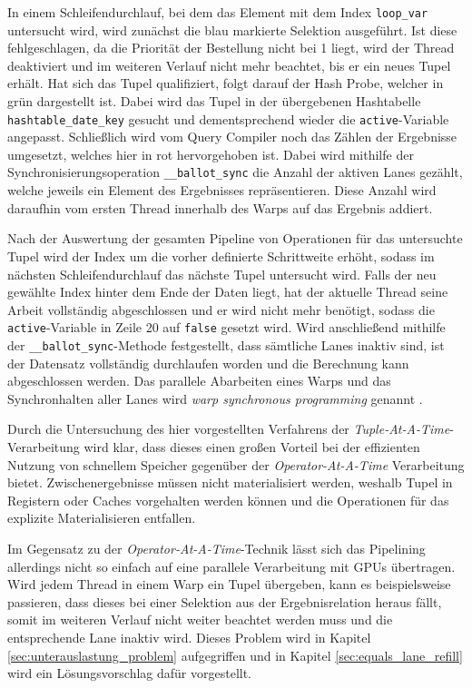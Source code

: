 In einem Schleifendurchlauf, bei dem das Element mit dem Index \texttt{loop\_var} untersucht wird, wird zunächst die blau markierte Selektion ausgeführt.
Ist diese fehlgeschlagen, da die Priorität der Bestellung nicht bei 1 liegt, wird der Thread deaktiviert und im weiteren Verlauf nicht mehr beachtet, bis er ein neues Tupel erhält.
Hat sich das Tupel qualifiziert, folgt darauf der Hash Probe, welcher in grün dargestellt ist.
Dabei wird das Tupel in der übergebenen Hashtabelle \texttt{hashtable\_date\_key} gesucht und dementsprechend wieder die \texttt{active}-Variable angepasst.
Schließlich wird vom Query Compiler noch das Zählen der Ergebnisse umgesetzt, welches hier in rot hervorgehoben ist.
Dabei wird mithilfe der Synchronisierungsoperation \texttt{\_\_ballot\_sync} die Anzahl der aktiven Lanes gezählt, welche jeweils ein Element des Ergebnisses repräsentieren.
Diese Anzahl wird daraufhin vom ersten Thread innerhalb des Warps auf das Ergebnis addiert. 

Nach der Auswertung der gesamten Pipeline von Operationen für das untersuchte Tupel wird der Index um die vorher definierte Schrittweite erhöht, sodass im nächsten Schleifendurchlauf das nächste Tupel untersucht wird.
Falls der neu gewählte Index hinter dem Ende der Daten liegt, hat der aktuelle Thread seine Arbeit vollständig abgeschlossen und er wird nicht mehr benötigt, sodass die \texttt{active}-Variable in Zeile 20 auf \texttt{false} gesetzt wird.
Wird anschließend mithilfe der \texttt{\_\_ballot\_sync}-Methode festgestellt, dass sämtliche Lanes inaktiv sind, ist der Datensatz vollständig durchlaufen worden und die Berechnung kann abgeschlossen werden.
Das parallele Abarbeiten eines Warps und das Synchronhalten aller Lanes wird \emph{warp synchronous programming} genannt \cite{Lin2018}.

Durch die Untersuchung des hier vorgestellten Verfahrens der \emph{Tuple-At-A-Time}-Verarbeitung wird klar, dass dieses einen großen Vorteil bei der effizienten Nutzung von schnellem Speicher gegenüber der \emph{Operator-At-A-Time} Verarbeitung bietet.
Zwischenergebnisse müssen nicht materialisiert werden, weshalb Tupel in Registern oder Caches vorgehalten werden können und die Operationen für das explizite Materialisieren entfallen.

Im Gegensatz zu der \emph{Operator-At-A-Time}-Technik lässt sich das Pipelining allerdings nicht so einfach auf eine parallele Verarbeitung mit GPUs übertragen.
Wird jedem Thread in einem Warp ein Tupel übergeben, kann es beispielsweise passieren, dass dieses bei einer Selektion aus der Ergebnisrelation heraus fällt, somit im weiteren Verlauf nicht weiter beachtet werden muss und die entsprechende Lane inaktiv wird.
Dieses Problem wird in Kapitel \ref{sec:unterauslastung_problem} aufgegriffen und in Kapitel \ref{sec:equals_lane_refill} wird ein Lösungsvorschlag dafür vorgestellt.